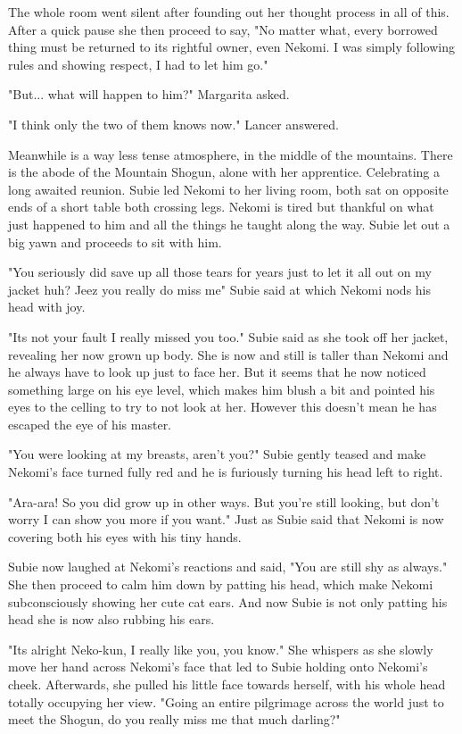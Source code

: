 The whole room went silent after founding out her thought process in all of this. After a quick pause she then proceed to say, "No matter what, every borrowed thing must be returned to its rightful owner, even Nekomi. I was simply following rules and showing respect, I had to let him go."

"But... what will happen to him?" Margarita asked. 

"I think only the two of them knows now." Lancer answered.

Meanwhile is a way less tense atmosphere, in the middle of the mountains. There is the abode of the Mountain Shogun, alone with her apprentice. Celebrating a long awaited reunion. Subie led Nekomi to her living room, both sat on opposite ends of a short table both crossing legs. Nekomi is tired but thankful on what just happened to him and all the things he taught along the way. Subie let out a big yawn and proceeds to sit with him. 

"You seriously did save up all those tears for years just to let it all out on my jacket huh? Jeez you really do miss me" Subie said at which Nekomi nods his head with joy.

"Its not your fault I really missed you too." Subie said as she took off her jacket, revealing her now grown up body. She is now and still is taller than Nekomi and he always have to look up just to face her. But it seems that he now noticed something large on his eye level, which makes him blush a bit and pointed his eyes to the celling to try to not look at her.
However this doesn't mean he has escaped the eye of his master.

"You were looking at my breasts, aren't you?" Subie gently teased and make Nekomi's face turned fully red and he is furiously turning his head left to right.

"Ara-ara! So you did grow up in other ways. But you're still looking, but don't worry I can show you more if you want." Just as Subie said that Nekomi is now covering both his eyes with his tiny hands.

Subie now laughed at Nekomi's reactions and said, "You are still shy as always." She then proceed to calm him down by patting his head, which make Nekomi subconsciously showing her cute cat ears. And now Subie is not only patting his head she is now also rubbing his ears.

"Its alright Neko-kun, I really like you, you know." She whispers as she slowly move her hand across Nekomi's face that led to Subie holding onto Nekomi's cheek. Afterwards, she pulled his little face towards herself, with his whole head totally occupying her view. "Going an entire pilgrimage across the world just to meet the Shogun, do you really miss me that much darling?"

